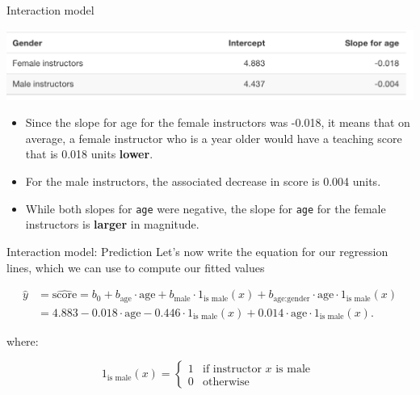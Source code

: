 \documentclass[
  ignorenonframetext,
]{beamer}
\begin{document}
\begin{frame}[fragile]{Interaction model}
\protect\hypertarget{interaction-model-4}{}
\begin{center}\includegraphics[width=0.6\linewidth,height=0.3\textheight]{week5_2} \end{center}

\begin{itemize}
\item
  Since the slope for age for the female instructors was -0.018, it
  means that on average, a female instructor who is a year older would
  have a teaching score that is 0.018 units \textbf{lower}.
\item
  For the male instructors, the associated decrease in score is 0.004
  units.
\item
  While both slopes for \texttt{age} were negative, the slope for
  \texttt{age} for the female instructors is \textbf{larger} in
  magnitude.
\end{itemize}
\end{frame}

\begin{frame}{Interaction model: Prediction}
\protect\hypertarget{interaction-model-prediction}{}
Let's now write the equation for our regression lines, which we can use
to compute our fitted values

\[\begin{array}{ll}
\hat{y}&=\widehat{\text{score}}=b_0+b_{\text{age}}\cdot \text{age}+b_{\text{male}}\cdot 1_{\text{is male}}(x)+b_{\text{age:gender}}\cdot \text{age}\cdot 1_{\text{is male}}(x)\\
&=4.883-0.018\cdot \text{age}-0.446\cdot 1_{\text{is male}}(x)+0.014\cdot \text{age}\cdot1_{\text{is male}}(x).
\end{array}\]

where:

\[1_{\text{is male}}(x)=\left\{\begin{array}{ll} 1 & \text{if instructor } x \text{ is male }\\
0 & \text{otherwise} \end{array}\right.\]
\end{frame}
\end{document}
